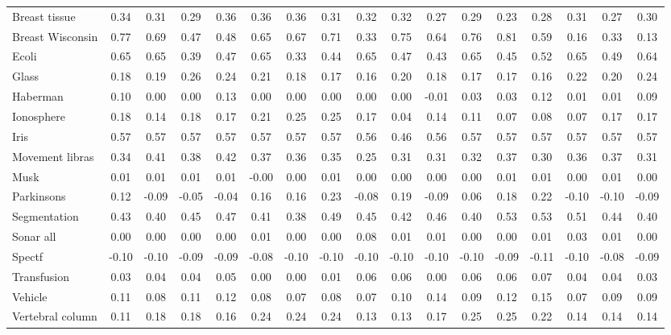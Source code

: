 \documentclass[preprint,12pt]{elsarticle}
\begin{document}
\begin{landscape}
\begin{table}[h!]
{\begin{tabular}{l c ccc ccc ccc ccc ccc}
\midrule
Breast tissue & 0.34 & 0.31 & 0.29 & 0.36 & 0.36 & 0.36 & 0.31 & 0.32 & 0.32 & 0.27 & 0.29 & 0.23 & 0.28 & 0.31 & 0.27 & 0.30 \\
Breast Wisconsin & 0.77 & 0.69 & 0.47 & 0.48 & 0.65 & 0.67 & 0.71 & 0.33 & 0.75 & 0.64 & 0.76 & 0.81 & 0.59 & 0.16 & 0.33 & 0.13 \\
Ecoli & 0.65 & 0.65 & 0.39 & 0.47 & 0.65 & 0.33 & 0.44 & 0.65 & 0.47 & 0.43 & 0.65 & 0.45 & 0.52 & 0.65 & 0.49 & 0.64 \\
Glass & 0.18 & 0.19 & 0.26 & 0.24 & 0.21 & 0.18 & 0.17 & 0.16 & 0.20 & 0.18 & 0.17 & 0.17 & 0.16 & 0.22 & 0.20 & 0.24 \\
Haberman & 0.10 & 0.00 & 0.00 & 0.13 & 0.00 & 0.00 & 0.00 & 0.00 & 0.00 & -0.01 & 0.03 & 0.03 & 0.12 & 0.01 & 0.01 & 0.09 \\
Ionosphere & 0.18 & 0.14 & 0.18 & 0.17 & 0.21 & 0.25 & 0.25 & 0.17 & 0.04 & 0.14 & 0.11 & 0.07 & 0.08 & 0.07 & 0.17 & 0.17 \\
Iris & 0.57 & 0.57 & 0.57 & 0.57 & 0.57 & 0.57 & 0.57 & 0.56 & 0.46 & 0.56 & 0.57 & 0.57 & 0.57 & 0.57 & 0.57 & 0.57 \\
Movement libras & 0.34 & 0.41 & 0.38 & 0.42 & 0.37 & 0.36 & 0.35 & 0.25 & 0.31 & 0.31 & 0.32 & 0.37 & 0.30 & 0.36 & 0.37 & 0.31 
\\
Musk & 0.01 & 0.01 & 0.01 & 0.01 & -0.00 & 0.00 & 0.01 & 0.00 & 0.00 & 0.00 & 0.00 & 0.01 & 0.01 & 0.00 & 0.01 & 0.00 \\
Parkinsons & 0.12 & -0.09 & -0.05 & -0.04 & 0.16 & 0.16 & 0.23 & -0.08 & 0.19 & -0.09 & 0.06 & 0.18 & 0.22 & -0.10 & -0.10 & -0.09 \\
Segmentation & 0.43 & 0.40 & 0.45 & 0.47 & 0.41 & 0.38 & 0.49 & 0.45 & 0.42 & 0.46 & 0.40 & 0.53 & 0.53 & 0.51 & 0.44 & 0.40 \\
Sonar all & 0.00 & 0.00 & 0.00 & 0.00 & 0.01 & 0.00 & 0.00 & 0.08 & 0.01 & 0.01 & 0.00 & 0.00 & 0.01 & 0.03 & 0.01 & 0.00 \\
Spectf & -0.10 & -0.10 & -0.09 & -0.09 & -0.08 & -0.10 & -0.10 & -0.10 & -0.10 & -0.10 & -0.10 & -0.09 & -0.11 & -0.10 & -0.08 & -0.09 \\
Transfusion & 0.03 & 0.04 & 0.04 & 0.05 & 0.00 & 0.00 & 0.01 & 0.06 & 0.06 & 0.00 & 0.06 & 0.06 & 0.07 & 0.04 & 0.04 & 0.03 \\
Vehicle & 0.11 & 0.08 & 0.11 & 0.12 & 0.08 & 0.07 & 0.08 & 0.07 & 0.10 & 0.14 & 0.09 & 0.12 & 0.15 & 0.07 & 0.09 & 0.09 \\
Vertebral column & 0.11 & 0.18 & 0.18 & 0.16 & 0.24 & 0.24 & 0.24 & 0.13 & 0.13 & 0.17 & 0.25 & 0.25 & 0.22 & 0.14 & 0.14 & 0.14 \\

\end{tabular}}
\end{table}
\end{landscape}
\end{document}
